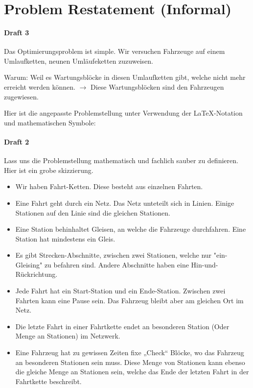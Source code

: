 \section{Problem Restatement (Informal)}

\paragraph{Draft 3}
Das Optimierungsproblem ist simple. Wir versuchen Fahrzeuge auf einem Umlaufketten, neunen Umläufeketten zuzuweisen.

Warum: Weil es Wartungsblöcke in diesen Umlaufketten gibt, welche nicht mehr erreicht werden können.
$\rightarrow$ Diese Wartungsblöcken sind den Fahrzeugen zugewiesen.

Hier ist die angepasste Problemstellung unter Verwendung der LaTeX-Notation und mathematischen Symbole:


\paragraph{Draft 2}

Lass uns die Problemstellung mathematisch und fachlich sauber zu definieren. Hier ist ein grobe skizzierung.

\begin{itemize}
	\item Wir haben Fahrt-Ketten. Diese besteht aus einzelnen Fahrten.
	\item Eine Fahrt geht durch ein Netz. Das Netz unteteilt sich in Linien. Einige Stationen auf den Linie sind die gleichen Stationen.
	\item Eine Station behinhaltet Gleisen, an welche die Fahrzeuge durchfahren. Eine Station hat mindestens ein Gleis. 
	\item Es gibt Strecken-Abschnitte, zwischen zwei Stationen, welche nur "ein-Gleising" zu befahren sind. Andere Abschnitte haben eine Hin-und-Rückrichtung.
	\item Jede Fahrt hat ein Start-Station und ein Ende-Station. Zwischen zwei Fahrten kann eine Pause sein. Das Fahrzeug bleibt aber am gleichen Ort im Netz.
	\item Die letzte Fahrt in einer Fahrtkette endet an besonderen Station (Oder Menge an Stationen) im Netzwerk.
\end{itemize}


\begin{itemize}
	\item Eine Fahrzeug hat zu gewissen Zeiten fixe „Check“ Blöcke, wo das Fahrzeug an besonderen Stationen sein muss. Diese Menge von Stationen kann ebenso die gleiche Menge an Stationen sein, welche das Ende der letzten Fahrt in der Fahrtkette beschreibt.
\end{itemize}

